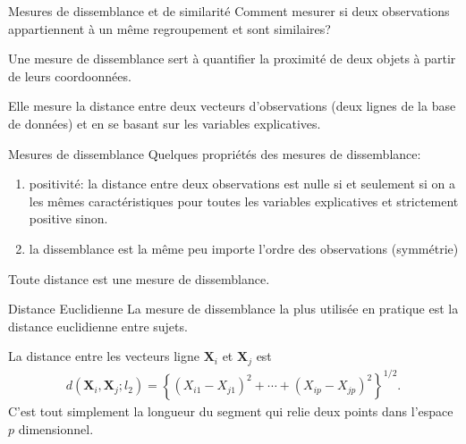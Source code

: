 \documentclass[
  ignorenonframetext,
]{beamer}
\providecommand{\tightlist}{%
  \setlength{\itemsep}{0pt}\setlength{\parskip}{0pt}}\usepackage{longtable,booktabs,array}
\begin{document}
\begin{frame}{Mesures de dissemblance et de similarité}
\protect\hypertarget{mesures-de-dissemblance-et-de-similarituxe9}{}
Comment mesurer si deux observations appartiennent à un même
regroupement et sont similaires?

Une mesure de dissemblance sert à quantifier la proximité de deux objets
à partir de leurs coordoonnées.

Elle mesure la distance entre deux vecteurs d'observations (deux lignes
de la base de données) et en se basant sur les variables explicatives.
\end{frame}

\begin{frame}{Mesures de dissemblance}
\protect\hypertarget{mesures-de-dissemblance}{}
Quelques propriétés des mesures de dissemblance:

\begin{enumerate}
\tightlist
\item
  positivité: la distance entre deux observations est nulle si et
  seulement si on a les mêmes caractéristiques pour toutes les variables
  explicatives et strictement positive sinon.
\item
  la dissemblance est la même peu importe l'ordre des observations
  (symmétrie)
\end{enumerate}

Toute distance est une mesure de dissemblance.
\end{frame}

\begin{frame}{Distance Euclidienne}
\protect\hypertarget{distance-euclidienne}{}
La mesure de dissemblance la plus utilisée en pratique est la distance
euclidienne entre sujets.

La distance entre les vecteurs ligne \(\mathbf{X}_i\) et
\(\mathbf{X}_j\) est \begin{align*}
d(\mathbf{X}_i, \mathbf{X}_j; l_2) = \left\{(X_{i1}-X_{j1})^2 + \cdots + (X_{ip}-X_{jp})^2\right\}^{1/2}.
\end{align*} C'est tout simplement la longueur du segment qui relie deux
points dans l'espace \(p\) dimensionnel.
\end{frame}
\end{document}
